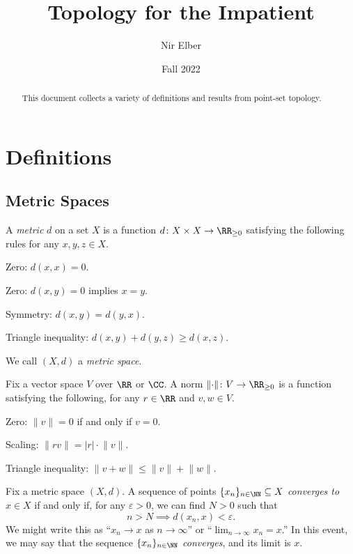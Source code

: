 \documentclass{article}
\title{Topology for the Impatient}
\author{Nir Elber}
\date{Fall 2022}
\begin{document}
\maketitle

\begin{abstract}
	This document collects a variety of definitions and results from point-set topology.
\end{abstract}

\tableofcontents

\newpage

\section{Definitions}

\subsection{Metric Spaces}
\begin{definition}[Metric] \label{defi:metric}
	A \textit{metric} $d$ on a set $X$ is a function $d\colon X\times X\to\RR_{\ge0}$ satisfying the following rules for any $x,y,z\in X$.
	\begin{listalph}
		\item Zero: $d(x,x)=0$.
		\item Zero: $d(x,y)=0$ implies $x=y$.
		\item Symmetry: $d(x,y)=d(y,x)$.
		\item Triangle inequality: $d(x,y)+d(y,z)\ge d(x,z)$.
	\end{listalph}
	We call $(X,d)$ a \textit{metric space}.
\end{definition}
\begin{definition}[Norm]
	Fix a vector space $V$ over $\RR$ or $\CC$. A norm $\lVert\cdot\rVert\colon V\to\RR_{\ge0}$ is a function satisfying the following, for any $r\in\RR$ and $v,w\in V$.
	\begin{listalph}
		\item Zero: $\lVert v\rVert=0$ if and only if $v=0$.
		\item Scaling: $\lVert rv\rVert=|r|\cdot\lVert v\rVert$.
		\item Triangle inequality: $\lVert v+w\rVert\le\lVert v\rVert+\lVert w\rVert$.
	\end{listalph}
\end{definition}
\begin{definition}[Converge]
	Fix a metric space $(X,d)$. A sequence of points $\{x_n\}_{n\in\NN}\subseteq X$ \textit{converges to} $x\in X$ if and only if, for any $\varepsilon>0$, we can find $N>0$ such that
	\[n>N\implies d(x_n,x)<\varepsilon.\]
	We might write this as ``$x_n\to x$ as $n\to\infty$'' or ``$\lim_{n\to\infty}x_n=x$.'' In this event, we may say that the sequence $\{x_n\}_{n\in\NN}$ \textit{converges}, and its limit is $x$.
\end{definition}
\end{document}
